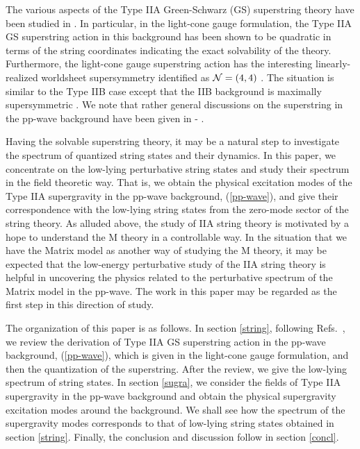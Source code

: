 \documentclass[a4paper,12pt]{article}
\numberwithin{equation}{section}
\begin{document}
The various aspects of the Type IIA Green-Schwarz (GS) superstring
theory have been studied in \cite{hyu074,sug029,hyu158,hyu343}.  In
particular, in the light-cone gauge formulation, the Type IIA GS
superstring action in this background has been shown to be quadratic
in terms of the string coordinates indicating the exact solvability of
the theory.  Furthermore, the light-cone gauge superstring action has
the interesting linearly-realized worldsheet supersymmetry identified
as ${\cal N}=(4,4)$ \cite{hyu074}.  The situation is similar to the
Type IIB case except that the IIB background is maximally
supersymmetric \cite{met044,met109}.  We note that rather general
discussions on the superstring in the pp-wave background have been
given in \cite{ali037}-\cite{rus179} .

Having the solvable superstring theory, it may be a natural step to
investigate the spectrum of quantized string states and their
dynamics.  In this paper, we concentrate on the low-lying perturbative
string states and study their spectrum in the field theoretic way.
That is, we obtain the physical excitation modes of the Type IIA
supergravity in the pp-wave background, (\ref{pp-wave}), and give
their correspondence with the low-lying string states from the
zero-mode sector of the string theory.  As alluded above, the study of
IIA string theory is motivated by a hope to understand the M theory in
a controllable way.  In the situation that we have the Matrix model as
another way of studying the M theory, it may be expected that the
low-energy perturbative study of the IIA string theory is helpful in
uncovering the physics related to the perturbative spectrum of the
Matrix model in the pp-wave.  The work in this paper may be regarded
as the first step in this direction of study.

The organization of this paper is as follows.  In section
\ref{string}, following Refs.~\cite{hyu074,hyu158}, we review the
derivation of Type IIA GS superstring action in the pp-wave
background, (\ref{pp-wave}), which is given in the light-cone gauge
formulation, and then the quantization of the superstring.  After the
review, we give the low-lying spectrum of string states.  In section
\ref{sugra}, we consider the fields of Type IIA supergravity in the
pp-wave background and obtain the physical supergravity excitation
modes around the background.  We shall see how the spectrum of the
supergravity modes corresponds to that of low-lying string states
obtained in section \ref{string}.  Finally, the conclusion and
discussion follow in section \ref{concl}.
\end{document}
